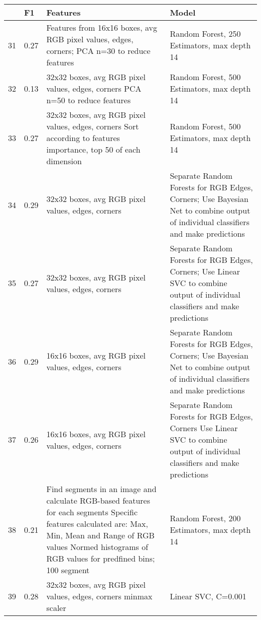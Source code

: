 \documentclass[10pt,a4paper]{article}
\begin{document}
\begin{table}[h]
\small
\begin{tabular}{ | p{0.5cm} | p{0.7cm} | p{5cm} | p{8cm} | }
\hline
	 & \textbf{F1} & \textbf{Features} & \textbf{Model} \\ \hline
	31 & 0.27 & Features from 16x16 boxes, avg RGB pixel values, edges, corners;
PCA n=30 to reduce features & Random Forest, 250 Estimators, max depth 14 \\ \hline
	32 & 0.13 & 32x32 boxes, avg RGB pixel values, edges, corners
PCA n=50 to reduce features & Random Forest, 500 Estimators, max depth 14 \\ \hline
	33 & 0.27 & 32x32 boxes, avg RGB pixel values, edges, corners
Sort according to features importance, top 50 of each dimension & Random Forest, 500 Estimators, max depth 14 \\ \hline
	34 & 0.29 & 32x32 boxes, avg RGB pixel values, edges, corners & Separate Random Forests for RGB Edges, Corners; Use Bayesian Net to combine output of individual classifiers and make predictions \\ \hline
	35 & 0.27 & 32x32 boxes, avg RGB pixel values, edges, corners & Separate Random Forests for RGB Edges, Corners; Use Linear SVC to combine output of individual classifiers and make predictions \\ \hline
	36 & 0.29 & 16x16 boxes, avg RGB pixel values, edges, corners & Separate Random Forests for RGB Edges, Corners; Use Bayesian Net to combine output of individual classifiers and make predictions \\ \hline
	37 & 0.26 & 16x16 boxes, avg RGB pixel values, edges, corners & Separate Random Forests for RGB Edges, Corners
Use Linear SVC to combine output of individual classifiers and make predictions \\ \hline
	38 & 0.21 & Find segments in an image and calculate RGB-based features for each segments
    Specific features calculated are:
    Max, Min, Mean and Range of RGB values
    Normed histograms of RGB values for predfined bins; 100 segment & Random Forest, 200 Estimators, max depth 14 \\ \hline
	39 & 0.28 & 32x32 boxes, avg RGB pixel values, edges, corners
minmax scaler & Linear SVC, C=0.001 \\ \hline
\end{tabular}
\end{table}
\end{document}
